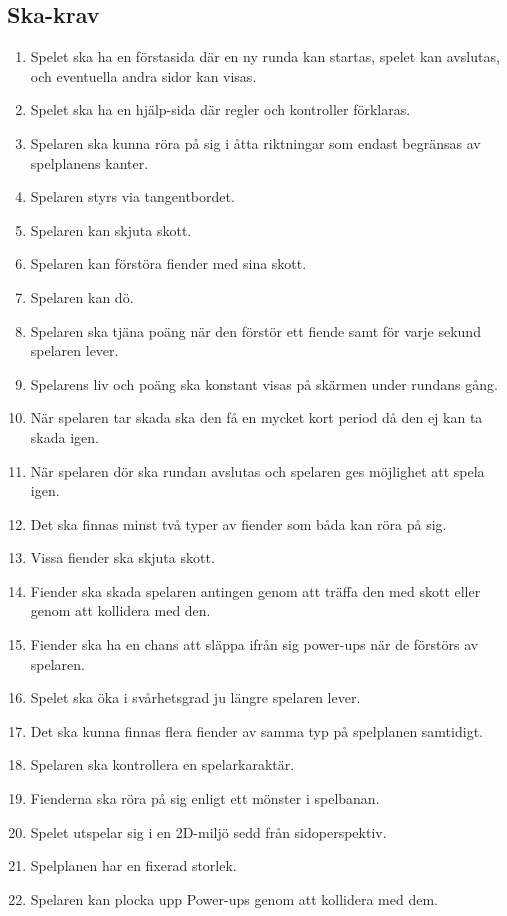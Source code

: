 \documentclass{TDP005mall}
\begin{document}
\subsection{Ska-krav}
\begin{enumerate}
\item Spelet ska ha en förstasida där en ny runda kan startas, spelet kan avslutas, och eventuella andra sidor kan visas.
\item Spelet ska ha en hjälp-sida där regler och kontroller förklaras.
\item Spelaren ska kunna röra på sig i åtta riktningar som endast begränsas av spelplanens kanter.
\item Spelaren styrs via tangentbordet.
\item Spelaren kan skjuta skott.
\item Spelaren kan förstöra fiender med sina skott.
\item Spelaren kan dö.
\item Spelaren ska tjäna poäng när den förstör ett fiende samt för varje sekund spelaren lever.
\item Spelarens liv och poäng ska konstant visas på skärmen under rundans gång.
\item När spelaren tar skada ska den få en mycket kort period då den ej kan ta skada igen.
\item När spelaren dör ska rundan avslutas och spelaren ges möjlighet att spela igen.
\item Det ska finnas minst två typer av fiender som båda kan röra på sig.
\item Vissa fiender ska skjuta skott.
\item Fiender ska skada spelaren antingen genom att träffa den med skott eller genom att kollidera med den.
\item Fiender ska ha en chans att släppa ifrån sig power-ups när de förstörs av spelaren.
\item Spelet ska öka i svårhetsgrad ju längre spelaren lever. %
\item Det ska kunna finnas flera fiender av samma typ på spelplanen samtidigt.
\item Spelaren ska kontrollera en spelarkaraktär.
\item Fienderna ska röra på sig enligt ett mönster i spelbanan.
\item Spelet utspelar sig i en 2D-miljö sedd från sidoperspektiv.
\item Spelplanen har en fixerad storlek.
\item Spelaren kan plocka upp Power-ups genom att kollidera med dem.
\end{enumerate}
\end{document}
